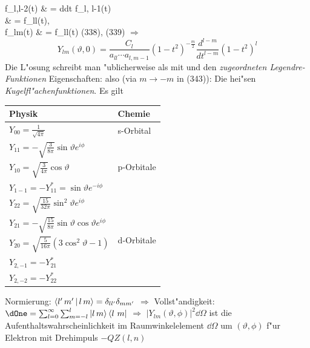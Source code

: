 \documentclass[a4paper]{scrartcl}
\begin{document}
{{f_{l,l-2}(t) & =  \frac d{dt} f_{l, l-1}(t) \notag \\
& =    f_{ll}(t), \notag \\
f_{lm}(t) & =   f_{ll}(t) \notag
}
(338), (339) $\Longrightarrow$
$$Y_{lm}(\vartheta, 0) = \frac{C_l}{a_{ll} \cdots a_{l, m-1}} (1-t^2)^{- \frac m2 } \frac{d^{l-m}}{dt^{l-m}} (1-t^2)^l$$
Die L"osung schreibt man "ublicherweise als
mit
und den \emph{zugeordneten Legendre-Funktionen}
Eigenschaften:
also (via $m \longrightarrow -m$ in (343)):
Die 
hei"sen \emph{Kugelfl"achenfunktionen}. Es gilt

\begin{center}
\begin{tabular}{l l }
Physik & Chemie \\
\hline 
$Y_{00} = \frac1{\sqrt{4\pi}}$ & s-Orbital \\
\hline
$Y_{11} = -\sqrt{ \frac 3{8 \pi}} \sin \vartheta e^{i \phi}$ & \multirow{3}{*}{p-Orbitale} \\
$Y_{10} = \sqrt{ \frac 3 {4\pi}} \cos \vartheta$ \\
$Y_{1-1} = -Y_{11}^* = \sin \vartheta e^{- i \phi}$ \\
\hline
$Y_{22} = \sqrt{ \frac {15}{32 \pi}} \sin^2 \vartheta e^{i \phi}$ & \multirow{5}{*}{d-Orbitale} \\
$Y_{21} = -\sqrt{ \frac{15}{8 \pi}} \sin \vartheta \cos \vartheta e^{i \phi}$ \\
$Y_{20} = \sqrt{\frac5{16 \pi}} (3 \cos^2 \vartheta - 1)$ \\
$Y_{2,- 1} = - Y_{21}^*$ \\
$Y_{2, -2} = - Y_{22}^*$
\end{tabular}
\end{center}
Normierung: $\Braket{ l' \, m' | l \, m} = \delta_{l l'} \delta_{m m '}$ $\Longrightarrow$
Vollst"andigkeit: $\dOne = \sum_{l=0}^\infty \sum_{m=-l}^l \Ket{ l \, m} \Bra{l \ m}$ $\Longrightarrow$
$\vert Y_{lm}(\vartheta, \phi) \vert^2 \dd \Omega$ ist die Aufenthaltswahrscheinlichkeit im Raumwinkelelement $\dd \Omega$ um $(\vartheta, \phi)$ f"ur Elektron mit Drehimpuls $-QZ(l,n)$

}
\end{document}
